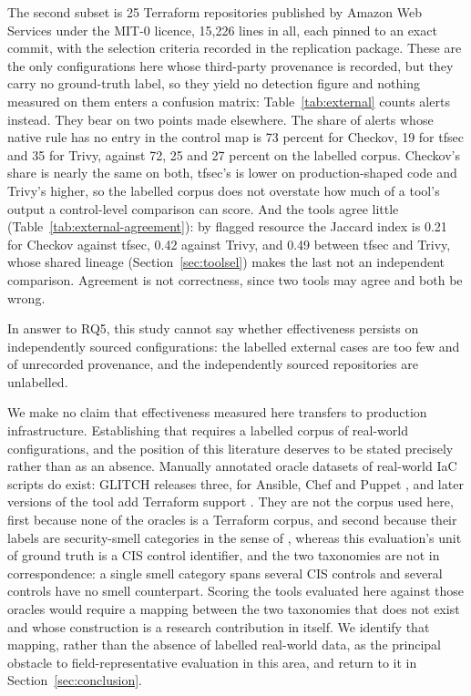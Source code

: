 \documentclass[smallextended]{svjour3}
\begin{document}
The second subset is 25 Terraform repositories published by Amazon Web Services
under the MIT-0 licence, 15,226 lines in all, each pinned to an exact commit, with
the selection criteria recorded in the replication package. These are the only
configurations here whose third-party provenance is recorded, but they carry no
ground-truth label, so they yield no detection figure and nothing measured on
them enters a confusion matrix: Table~\ref{tab:external} counts alerts instead.
They bear on two points made elsewhere. The share of alerts whose native rule has
no entry in the control map is 73 percent for Checkov, 19 for tfsec and 35 for
Trivy, against 72, 25 and 27 percent on the labelled corpus. Checkov's share is nearly
the same on both, tfsec's is lower on production-shaped code and Trivy's higher,
so the labelled corpus does not overstate how much of a tool's output a
control-level comparison can score. And the tools agree little
(Table~\ref{tab:external-agreement}): by flagged resource the Jaccard index is
0.21 for Checkov against tfsec, 0.42 against Trivy, and 0.49 between tfsec and
Trivy, whose shared lineage (Section~\ref{sec:toolsel}) makes the last not an
independent comparison. Agreement is not correctness, since two tools may agree
and both be wrong.

In answer to RQ5, this study cannot say whether effectiveness persists on
independently sourced configurations: the labelled external cases are too few and
of unrecorded provenance, and the independently sourced repositories are
unlabelled.

We make no claim that effectiveness measured here transfers to production
infrastructure. Establishing that requires a labelled corpus of real-world
configurations, and the position of this literature deserves to be stated
precisely rather than as an absence. Manually annotated oracle datasets of
real-world IaC scripts do exist: GLITCH releases three, for Ansible, Chef and
Puppet \citep{saavedra2022glitch}, and later versions of the tool add Terraform
support \citep{saavedra2023polyglot}. They are not the corpus used here, first
because none of the oracles is a Terraform corpus, and second because their labels are security-smell categories in the sense of
\citet{rahman2019sins}, whereas this evaluation's unit of ground truth is a CIS
control identifier, and the two taxonomies are not in correspondence: a single
smell category spans several CIS controls and several controls have no smell
counterpart. Scoring the tools evaluated here against those oracles would require
a mapping between the two taxonomies that does not exist and whose construction
is a research contribution in itself. We identify that mapping, rather than the
absence of labelled real-world data, as the principal obstacle to
field-representative evaluation in this area, and return to it in
Section~\ref{sec:conclusion}.
\end{document}
